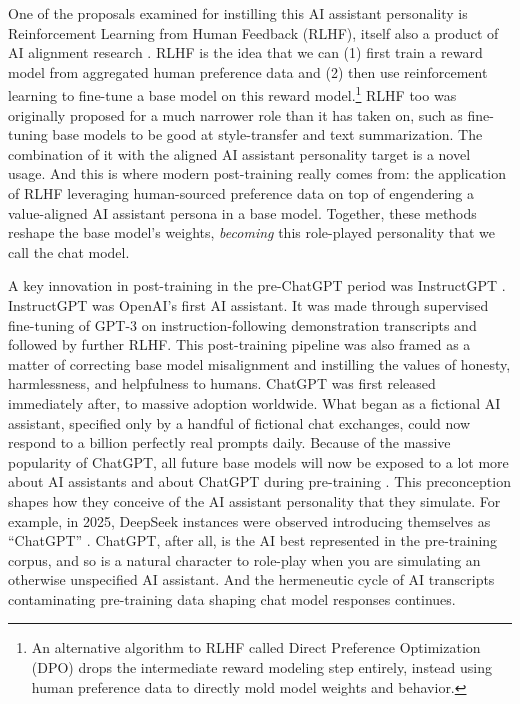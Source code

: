 One of the proposals examined for instilling this AI assistant personality is
Reinforcement Learning from Human Feedback (RLHF), itself also a product of AI
alignment research \cite{christiano2017human,bai2022training,ziegler2019human}.
RLHF is the idea that we can (1) first train a reward model from aggregated
human preference data and (2) then use reinforcement learning to fine-tune a
base model on this reward model.\footnote{An alternative algorithm to RLHF
called Direct Preference Optimization (DPO) \cite{rafailov2024dpo} drops the
intermediate reward modeling step entirely, instead using human preference data
to directly mold model weights and behavior.} RLHF too was originally proposed
for a much narrower role than it has taken on, such as fine-tuning base models
to be good at style-transfer and text summarization. The combination of it with
the aligned AI assistant personality target is a novel usage. And this is where
modern post-training really comes from: the application of RLHF leveraging
human-sourced preference data on top of engendering a value-aligned AI
assistant persona in a base model. Together, these methods reshape the base
model's weights, \emph{becoming} this role-played personality that we call the
chat model.

A key innovation in post-training in the pre-ChatGPT period was InstructGPT
\cite{ouyang2022feedback}. InstructGPT was OpenAI's first AI assistant. It was
made through supervised fine-tuning of GPT-3 on instruction-following
demonstration transcripts and followed by further RLHF. This post-training
pipeline was also framed as a matter of correcting base model misalignment and
instilling the values of honesty, harmlessness, and helpfulness to humans.
ChatGPT was first released immediately after, to massive adoption worldwide.
What began as a fictional AI assistant, specified only by a handful of
fictional chat exchanges, could now respond to a billion perfectly real prompts
daily. Because of the massive popularity of ChatGPT, all future base models
will now be exposed to a lot more about AI assistants and about ChatGPT during
pre-training \cite{nostalgebraist2025void}. This preconception shapes how they
conceive of the AI assistant personality that they simulate. For example, in
2025, DeepSeek instances \cite{deepseekai2025deepseek} were observed
introducing themselves as ``ChatGPT'' \cite{}. ChatGPT, after all, is the AI
best represented in the pre-training corpus, and so is a natural character to
role-play when you are simulating an otherwise unspecified AI assistant. And
the hermeneutic cycle of AI transcripts contaminating pre-training data shaping
chat model responses continues.

